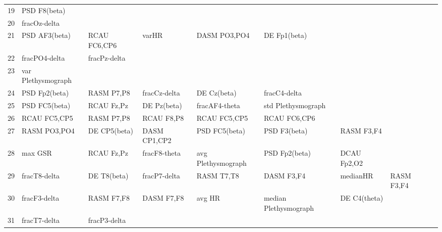 \begin{landscape}
\begin{table}[]
\begin{tabular}{l|llllllll}
19                 & PSD F8(beta)         &                         &                      &                    &                       &                      &                 &                 \\
20                 & fracOz-delta         &                         &                      &                    &                       &                      &                 &                 \\
21                 & PSD AF3(beta)        & RCAU FC6,CP6            & varHR                & DASM PO3,PO4       & DE Fp1(beta)          &                      &                 &                 \\
22                 & fracPO4-delta        & fracPz-delta            &                      &                    &                       &                      &                 &                 \\
23                 & var Plethysmograph   &                         &                      &                    &                       &                      &                 &                 \\
24                 & PSD Fp2(beta)        & RASM P7,P8              & fracCz-delta         & DE Cz(beta)        & fracC4-delta          &                      &                 &                 \\
25                 & PSD FC5(beta)        & RCAU Fz,Pz              & DE Pz(beta)          & fracAF4-theta      & std Plethysmograph    &                      &                 &                 \\
26                 & RCAU FC5,CP5         & RASM P7,P8              & RCAU F8,P8           & RCAU FC5,CP5       & RCAU FC6,CP6          &                      &                 &                 \\
27                 & RASM PO3,PO4         & DE CP5(beta)            & DASM CP1,CP2         & PSD FC5(beta)      & PSD F3(beta)          & RASM F3,F4           &                 &                 \\
28                 & max GSR              & RCAU Fz,Pz              & fracF8-theta         & avg Plethysmograph & PSD Fp2(beta)         & DCAU Fp2,O2          &                 &                 \\
29                 & fracT8-delta         & DE T8(beta)             & fracP7-delta         & RASM T7,T8         & DASM F3,F4            & medianHR             & RASM F3,F4      &                 \\
30                 & fracF3-delta         & RASM F7,F8              & DASM F7,F8           & avg HR             & median Plethysmograph & DE C4(theta)         &                 &                 \\
31                 & fracT7-delta         & fracP3-delta            &                      &                    &                       &                      &                 &                 
\end{tabular}
\end{table}
\end{landscape}